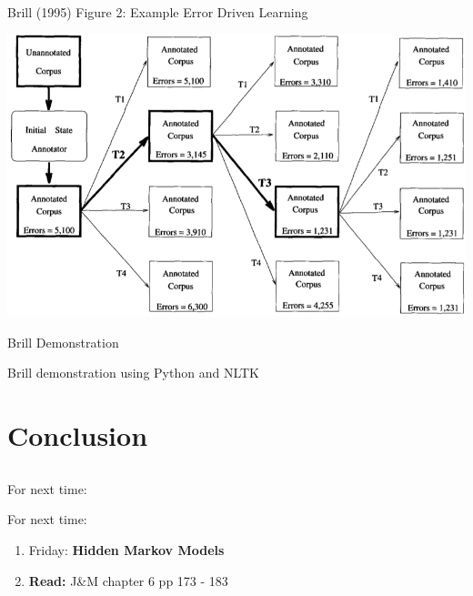 \documentclass[9pt,xcolor=pdftex,dvipsnames,table]{beamer}
\begin{document}
\begin{frame}{Brill (1995) Figure 2: Example Error Driven Learning}

	\begin{center}
		\includegraphics[width=.9\paperwidth]{brill2}
	\end{center}
\end{frame}

\begin{frame}{Brill Demonstration}

	\begin{center}
		{\large Brill demonstration using Python and NLTK }
	\end{center}
\end{frame}

\section{Conclusion}

\subsection{}
\begin{frame}{For next time:}

     \begin{block}{For next time:}
          \begin{enumerate}
          \item Friday: \textbf{Hidden Markov Models}
          \item \textbf{Read:} J\&M chapter 6 pp 173 - 183 
          \end{enumerate}
     \end{block}
\end{frame}
\end{document}
